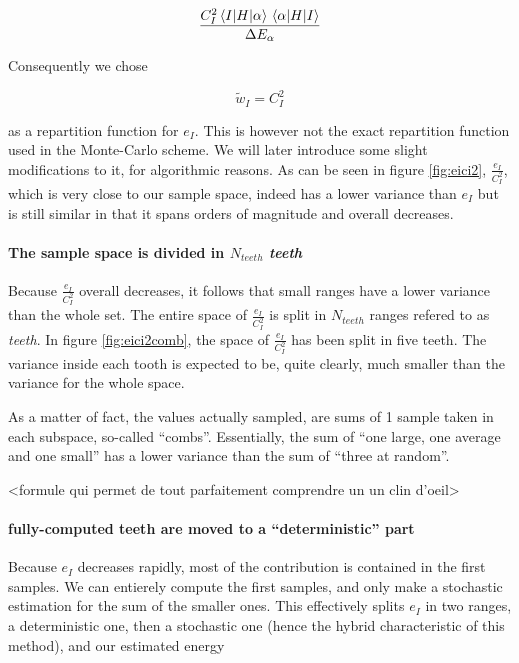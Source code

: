 \documentclass[./thesis.tex]{subfiles}
\begin{document}
\begin{equation}
\frac{C_I^2 \mel{I}{H}{\alpha}\mel{\alpha}{H}{I}}{\Delta E_{\alpha}}
\end{equation}

Consequently we chose

\begin{equation}
\tilde w_I = C_I^2
\end{equation}

as a repartition function for $e_I$. This is however not the exact repartition function used in the Monte-Carlo scheme. We will later introduce some slight modifications to it, for algorithmic reasons.
As can be seen in figure \ref{fig:eici2}, $\frac{e_I}{C_I^2}$, which is very close to our sample space, indeed has a lower variance than $e_I$ but is still similar in that it spans orders of magnitude and overall decreases.

\paragraph{The sample space is divided in $N_{teeth}$ \emph{teeth}}

Because $\frac{e_I}{C_I^2}$ overall decreases, it follows that small ranges have a lower variance than the whole set. The entire space of $\frac{e_I}{C_I^2}$ is split in $N_{teeth}$ ranges refered to as \emph{teeth}. In figure \ref{fig:eici2comb}, the space of $\frac{e_I}{C_I^2}$ has been split in five teeth. The variance inside each tooth is expected to be, quite clearly, much smaller than the variance for the whole space.

As a matter of fact, the values actually sampled, are sums of 1 sample taken in each subspace, so-called ``combs''. Essentially, the sum of ``one large, one average and one small'' has a lower variance than the sum of ``three at random''.

<formule qui permet de tout parfaitement comprendre un un clin d'oeil>


\paragraph{fully-computed teeth are moved to a ``deterministic'' part}


Because $e_I$ decreases rapidly, most of the contribution is contained in the first samples. We can entierely compute the first samples, and only make a stochastic estimation for the sum of the smaller ones. This effectively splits $e_I$ in two ranges, a deterministic one, then a stochastic one (hence the hybrid characteristic of this method), and our estimated energy
\end{document}
